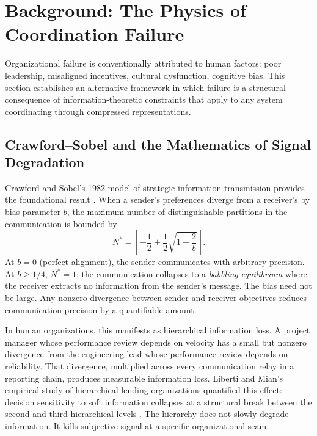 \documentclass[11pt,a4paper]{article}
\begin{document}
\section{Background: The Physics of Coordination Failure}
\label{sec:background}

Organizational failure is conventionally attributed to human factors: poor leadership, misaligned incentives, cultural dysfunction, cognitive bias. This section establishes an alternative framework in which failure is a structural consequence of information-theoretic constraints that apply to any system coordinating through compressed representations.

\subsection{Crawford--Sobel and the Mathematics of Signal Degradation}

Crawford and Sobel's 1982 model of strategic information transmission provides the foundational result \citep{crawford1982}. When a sender's preferences diverge from a receiver's by bias parameter $b$, the maximum number of distinguishable partitions in the communication is bounded by
\begin{equation}
\label{eq:cs}
N^* = \left\lceil -\frac{1}{2} + \frac{1}{2}\sqrt{1 + \frac{2}{b}} \right\rceil.
\end{equation}
At $b = 0$ (perfect alignment), the sender communicates with arbitrary precision. At $b \geq 1/4$, $N^* = 1$: the communication collapses to a \emph{babbling equilibrium} where the receiver extracts no information from the sender's message. The bias need not be large. Any nonzero divergence between sender and receiver objectives reduces communication precision by a quantifiable amount.

In human organizations, this manifests as hierarchical information loss. A project manager whose performance review depends on velocity has a small but nonzero divergence from the engineering lead whose performance review depends on reliability. That divergence, multiplied across every communication relay in a reporting chain, produces measurable information loss. Liberti and Mian's empirical study of hierarchical lending organizations quantified this effect: decision sensitivity to soft information collapses at a structural break between the second and third hierarchical levels \citep{liberti2009}. The hierarchy does not slowly degrade information. It kills subjective signal at a specific organizational seam.
\end{document}
